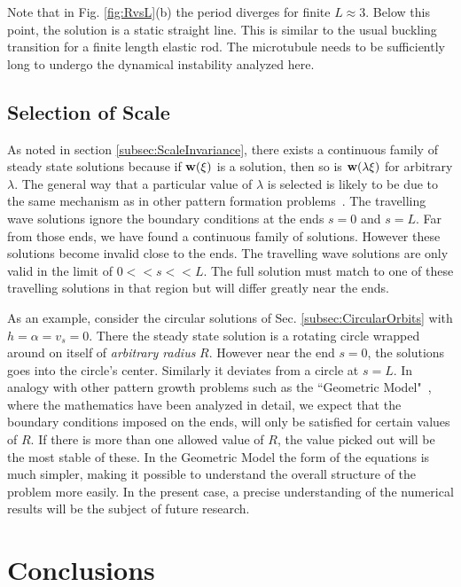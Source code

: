 \documentclass[pre,showpacs]{revtex4}
\def\bw{{\bf w}}
\begin{document}
Note that in Fig. \ref{fig:RvsL}(b) the period diverges for finite $L \approx 3$. Below this
point, the solution is a static straight line. This is similar to the usual buckling transition
for a finite length elastic rod. The microtubule needs to be sufficiently long to undergo
the dynamical instability analyzed here. 


\subsection{Selection of Scale}

As noted in section \ref{subsec:ScaleInvariance}, there exists
a continuous family of steady state solutions because  if
$\bw(\xi)$ is a solution, then so is $\bw(\lambda \xi)$ for arbitrary
$\lambda$. The general way that a particular value of $\lambda$ is selected
is likely to be due to the same mechanism as in other pattern formation
problems~\cite{Kessler,Barbieri}. The travelling wave solutions ignore the
boundary conditions at the ends $s=0$ and $s=L$.  Far from those ends,
we have found a continuous family of solutions. However these solutions
become invalid close to the ends.  The travelling wave solutions are
only valid in the limit of $0 << s << L$. The full solution must match
to one of these travelling solutions in that region but will differ
greatly near the ends.

As an example, consider the circular solutions of
Sec. \ref{subsec:CircularOrbits} with $h = \alpha = v_s = 0$. There the
steady state solution is a rotating circle wrapped around on itself of
{\em arbitrary radius} $R$.  However near the end $s=0$, the solutions
goes into the circle's center. Similarly it deviates from a circle
at $s=L$.  In analogy with other pattern growth problems such as the
``Geometric Model"~\cite{Kessler},  where the mathematics have been analyzed
in detail, we expect that the boundary conditions imposed on the ends,
will only be satisfied for certain values of $R$. If there is more than
one allowed value of $R$, the value picked out will be the most stable of
these. In the Geometric Model the form of the equations is much simpler,
making it possible to understand the overall structure of the problem
more easily. In the present case, a precise understanding of the numerical
results will be the subject of future research.


\section{Conclusions}
\end{document}
